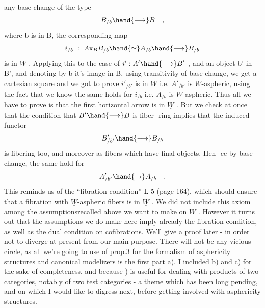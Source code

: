
any base change of the type
\[ B_{/b} \hand{\longrightarrow} B \quad , \]
where b is in B,  the corresponding map
\[ i_{/b} \ : \ A\mathrm{x}_{B}B_{/b} \hand{\simeq} A_{/b} \hand{\longrightarrow} B_{/b} \]
is in $\underline{W}$ .  Applying this to the case of $i' : A' \hand{\longrightarrow} B'$ ,  and an  object
b' in B',  and denoting by b it's image in B,   using transitivity of
base change,  we get a cartesian square
and we got to prove $i'_{/b'}$ is in $\underline{W}$  i.e. $A'_{/b'}$ is $\underline{W}$-aspheric,  using
the fact that we know the same holds for $i_{/b}$  i.e. $A_{/b}$ is $\underline{W}$-aspheric.
Thus all we have to prove is that the first horizontal arrow
is in $\underline{W}$ .  But we check at once that the condition that $B' \hand{\longrightarrow} B$ is fiber-%
ring  implies that the induced functor  
\[ B'_{/b'} \hand{\longrightarrow} B_{/b} \]
is fibering too,  and moreover as fibers which have final objects.  Hen-%
ce by base change,  the same  hold for  
\[ A'_{/b'} \hand{\rightarrow} A_{/b} \quad . \]
This reminds us of the ``fibration condition''  L 5  (page 164),  which
should ensure that a fibration with $\underline{W}$-aspheric fibers is in $\underline{W}$ .  We did
not include this axiom among the assumptions\hand{(}recalled above\hand{)}  we want to
make on $\underline{W}$ .  However it turns out that the assumptions we do make here
imply already the fibration condition,  as well as the dual condition
on cofibrations.  We'll give a proof later  -  in order not to diverge
at present from our main purpose.  There will not be any vicious circle,
as all we're going to use of prop.3  for the formalism of asphericity
structures  and canonical modelizers is the first part a).  I included
b) and c) for the sake of completeness,  and because ) is useful for
dealing with products of two categories,  notably of two test categories
-  a theme which has been long pending,  and on which I would like to
digress next,  before getting involved with asphericity structures.

